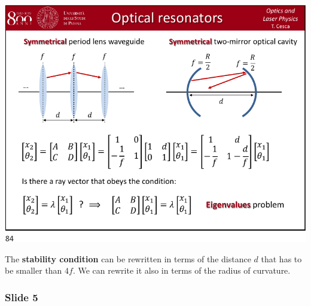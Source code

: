 \documentclass[../main/main.tex]{subfiles}
\begin{document}
\begin{minipage}[]{0.5\linewidth}
\centering
\includegraphics[page=4,width=1\textwidth]{../lessons/pdf_file/21_lecture.pdf}
\end{minipage}
\hspace{0.3cm}\vspace{0.3cm}
\begin{minipage}[c]{0.47\linewidth}

The \textbf{stability condition} can be rewritten in terms of the distance \( d \) that has to be smaller than \( 4 f \). We can rewrite it also in terms of the radius of curvature.

\end{minipage}

\subsubsection*{Slide 5}
\end{document}
